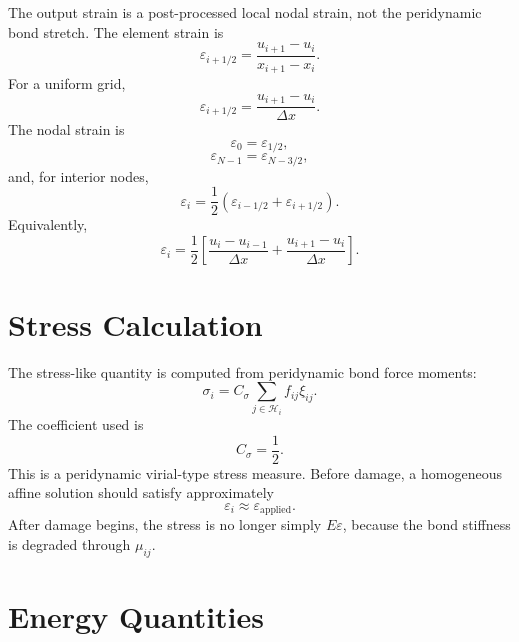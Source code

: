 \documentclass[11pt]{article}
\begin{document}
The output strain is a post-processed local nodal strain, not the peridynamic bond stretch. The element strain is
\begin{equation}
\varepsilon_{i+1/2}
=
\frac{u_{i+1}-u_i}{x_{i+1}-x_i}.
\end{equation}
For a uniform grid,
\begin{equation}
\varepsilon_{i+1/2}
=
\frac{u_{i+1}-u_i}{\Delta x}.
\end{equation}
The nodal strain is
\begin{equation}
\varepsilon_0
=
\varepsilon_{1/2},
\end{equation}
\begin{equation}
\varepsilon_{N-1}
=
\varepsilon_{N-3/2},
\end{equation}
and, for interior nodes,
\begin{equation}
\varepsilon_i
=
\frac{1}{2}
\left(
\varepsilon_{i-1/2}
+
\varepsilon_{i+1/2}
\right).
\end{equation}
Equivalently,
\begin{equation}
\varepsilon_i
=
\frac{1}{2}
\left[
\frac{u_i-u_{i-1}}{\Delta x}
+
\frac{u_{i+1}-u_i}{\Delta x}
\right].
\end{equation}

\section{Stress Calculation}

The stress-like quantity is computed from peridynamic bond force moments:
\begin{equation}
\sigma_i
=
C_\sigma
\sum_{j\in\mathcal{H}_i}
f_{ij}\xi_{ij}.
\end{equation}
The coefficient used is
\begin{equation}
C_\sigma=\frac{1}{2}.
\end{equation}
This is a peridynamic virial-type stress measure. Before damage, a homogeneous affine solution should satisfy approximately
\begin{equation}
\varepsilon_i \approx \varepsilon_{\mathrm{applied}}.
\end{equation}
After damage begins, the stress is no longer simply \(E\varepsilon\), because the bond stiffness is degraded through \(\mu_{ij}\).

\section{Energy Quantities}
\end{document}
